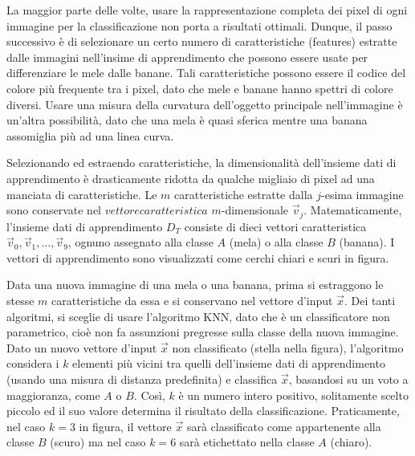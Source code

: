 La maggior parte delle volte, usare la rappresentazione completa dei pixel di 
ogni immagine per la classificazione non porta a risultati ottimali. Dunque, il 
passo successivo è di selezionare un certo numero di caratteristiche (features) 
estratte dalle immagini nell'insime di apprendimento che possono essere usate per 
differenziare le mele dalle banane. Tali caratteristiche possono essere il codice 
del colore più frequente tra i pixel, dato che mele e banane hanno spettri di 
colore diversi. Usare una misura della curvatura dell'oggetto principale 
nell'immagine è un'altra possibilità, dato che una mela è quasi sferica mentre 
una banana assomiglia più ad una linea curva. 

Selezionando ed estraendo caratteristiche, la dimensionalità dell'insieme dati 
di apprendimento è drasticamente ridotta da qualche migliaio di pixel ad una 
manciata di caratteristiche. Le $m$ caratteristiche estratte dalla $j$-esima 
immagine sono conservate nel $vettore caratteristica$ $m$-dimensionale 
$\vec{v}_j$. Matematicamente, l'insieme dati di apprendimento $D_T$ consiste di 
dieci vettori caratteristica $\vec{v}_0, \vec{v}_1, \ldots, \vec{v}_9$, ognuno 
assegnato alla classe $A$ (mela) o alla classe $B$ (banana). I vettori di 
apprendimento sono visualizzati come cerchi chiari e scuri in figura. 


Data una nuova immagine di una mela o una banana, prima si estraggono le stesse 
$m$ caratteristiche da essa e si conservano nel vettore d'input $\vec{x}$. Dei 
tanti algoritmi, si sceglie di usare l'algoritmo \ac{KNN}, dato che è un 
classificatore non parametrico, cioè non fa assunzioni pregresse sulla classe 
della nuova immagine. Dato un nuovo vettore d'input $\vec{x}$ non classificato 
(stella nella figura), %
l'algoritmo considera i $k$ elementi più vicini tra quelli dell'insieme dati 
di apprendimento (usando una misura di distanza predefinita) e classifica 
$\vec{x}$, basandosi su un voto a maggioranza, come $A$ o $B$. Così, $k$ è un 
numero intero positivo, solitamente scelto piccolo ed il suo valore determina 
il risultato della classificazione. Praticamente, nel caso $k=3$ in figura, 
il vettore $\vec{x}$ sarà classificato come appartenente alla classe $B$ (scuro) 
ma nel caso $k=6$ sarà etichettato nella classe $A$ (chiaro). 


